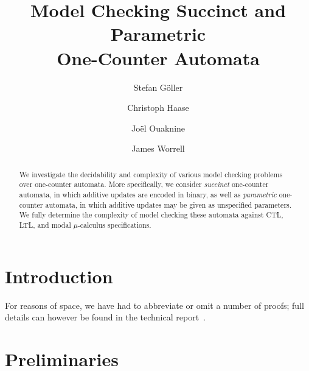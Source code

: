 \documentclass[times,envcountsame]{llncs}
\begin{document}
\title{Model Checking Succinct and Parametric\\ One-Counter Automata}
\author{Stefan G\"oller \and
Christoph Haase \and
Jo\"el Ouaknine \and
James Worrell
}



\maketitle

\begin{abstract}
  We investigate the decidability and complexity of various model
  checking problems over one-counter automata. More specifically, we
  consider \emph{succinct} one-counter automata, in which additive
  updates are encoded in binary, as well as \emph{parametric}
  one-counter automata, in which additive updates may be given as
  unspecified parameters. We fully determine the complexity of model
  checking these automata against CTL, LTL, and modal $\mu$-calculus
  specifications.
\end{abstract}


\section{Introduction}


For reasons of space, we have had to abbreviate or omit a number of
proofs; full details can however be found in the technical
report~\cite{techrep}.


\section{Preliminaries}

\newcommand{\N}{\mathbb{N}}
\newcommand{\Z}{\mathbb{Z}}
\renewcommand{\O}{\mathbb{O}}

\newcommand{\trans}[1]{\stackrel{#1}{\longrightarrow}}
\newcommand{\hook}[1]{\stackrel{#1}{\hookrightarrow}}
\renewcommand{\rule}[2]{\stackrel{#2}{\stackrel{#1}{\longrightarrow}}}

\renewcommand{\M}{\mathcal{M}}

\newcommand{\bit}{\text{bit}}
\renewcommand{\succ}{\text{succ}}

\newcommand{\Reach}{\text{Reach}}
\newcommand{\Moves}{\text{Moves}}
\newcommand{\bin}{\text{bin}}
\renewcommand{\l}{\triangleright}
\renewcommand{\r}{\triangleleft}
\newcommand{\move}{\vdash}
\end{document}
